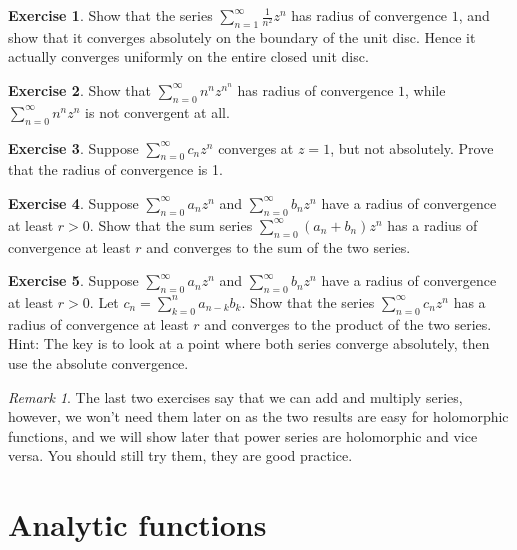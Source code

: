 \documentclass[12pt,openany]{book}
\theoremstyle{plain}
\theoremstyle{remark}
\newtheorem{remark}[thm]{Remark}
\theoremstyle{definition}
\newenvironment{exbox}{%
    \def\FrameCommand{\vrule width 1pt \relax\hspace{10pt}}%
    \MakeFramed{\advance\hsize-\width\FrameRestore}%
}{%
    \endMakeFramed
}
\theoremstyle{exercise}
\newtheorem{exercise}{Exercise}[section]
\theoremstyle{example}
\begin{document}
\begin{exbox}
\begin{exercise}
Show that the series $\sum_{n=1}^\infty \frac{1}{n^2} z^{n}$ has radius of
convergence $1$, and
show that it converges absolutely on the boundary of the unit disc.  Hence
it actually converges uniformly on the entire closed unit disc.
\end{exercise}

\begin{exercise}
Show that
$\sum_{n=0}^\infty n^n z^{n^n}$ has radius of convergence $1$,
while
$\sum_{n=0}^\infty n^n z^{n}$ is not convergent at all.
\end{exercise}

\begin{exercise}
Suppose
$\sum_{n=0}^\infty c_n z^{n}$ converges at $z=1$, but not absolutely.
Prove that the radius of convergence is 1.
\end{exercise}

\begin{exercise}
Suppose
$\sum_{n=0}^\infty a_n z^{n}$ and $\sum_{n=0}^\infty b_n z^{n}$
have a radius of convergence at least $r > 0$.  Show that
the sum series
$\sum_{n=0}^\infty (a_n+b_n) z^{n}$ has a radius of convergence at least
$r$ and converges to the sum of the two series.
\end{exercise}

\begin{exercise}
Suppose
$\sum_{n=0}^\infty a_n z^{n}$ and $\sum_{n=0}^\infty b_n z^{n}$
have a radius of convergence at least $r > 0$.  Let 
$c_n = \sum_{k=0}^n a_{n-k}b_k$.  Show that
the series
$\sum_{n=0}^\infty c_n z^{n}$ has a radius of convergence at least
$r$ and converges to the product of the two series.
Hint: The key is to look at a point where both series converge absolutely,
then use the absolute convergence.
\end{exercise}
\end{exbox}

\begin{remark}
The last two exercises say that we can add and multiply series, however,
we won't need them later on as the two results are easy for holomorphic
functions, and we will show later that power series are
holomorphic and vice versa.  You should still try them, they are good
practice.
\end{remark}


\section{Analytic functions}
\label{sec:analfuncs}
\end{document}
